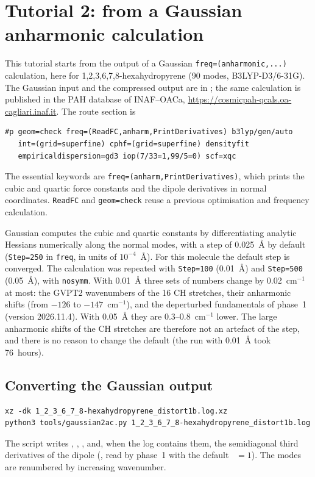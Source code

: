 \chapter{Tutorial 2: from a Gaussian anharmonic calculation}\label{ch:tut-gaussian}

This tutorial starts from the output of a Gaussian
\texttt{freq=(anharmonic,...)} calculation, here for
1,2,3,6,7,8-hexahydropyrene (90 modes, B3LYP-D3/6-31G). The Gaussian input
and the compressed output are in ; the
same calculation is published in the PAH database of INAF--OACa,
\url{https://cosmicpah-qcals.oa-cagliari.inaf.it}. The route section is
\begin{lstlisting}
#p geom=check freq=(ReadFC,anharm,PrintDerivatives) b3lyp/gen/auto
   int=(grid=superfine) cphf=(grid=superfine) densityfit
   empiricaldispersion=gd3 iop(7/33=1,99/5=0) scf=xqc
\end{lstlisting}
The essential keywords are \texttt{freq=(anharm,PrintDerivatives)}, which
prints the cubic and quartic force constants and the dipole derivatives
in normal coordinates. \texttt{ReadFC} and \texttt{geom=check} reuse a
previous optimisation and frequency calculation.

Gaussian computes the cubic and quartic constants by differentiating
analytic Hessians numerically along the normal modes, with a step of
0.025~\AA{} by default (\texttt{Step=250} in \texttt{freq}, in units of
$10^{-4}$~\AA). For this molecule the default step is converged. The
calculation was repeated with \texttt{Step=100} (0.01~\AA) and
\texttt{Step=500} (0.05~\AA), with \texttt{nosymm}. With 0.01~\AA{}
three sets of numbers change by 0.02~cm$^{-1}$ at most: the GVPT2
wavenumbers of the 16 CH stretches, their anharmonic shifts (from $-126$
to $-147$~cm$^{-1}$), and the deperturbed fundamentals of phase~1
(version 2026.11.4). With 0.05~\AA{} they are 0.3--0.8~cm$^{-1}$ lower.
The large anharmonic shifts of the CH stretches are therefore not an
artefact of the step, and there is no reason to change the default
(the run with 0.01~\AA{} took 76~hours).

\section{Converting the Gaussian output}

\begin{lstlisting}
xz -dk 1_2_3_6_7_8-hexahydropyrene_distort1b.log.xz
python3 tools/gaussian2ac.py 1_2_3_6_7_8-hexahydropyrene_distort1b.log
\end{lstlisting}
The script writes , , ,
 and, when the log contains them, the semidiagonal third
derivatives of the dipole (, read by phase~1 with the
default ~$=1$). The
modes are renumbered by increasing wavenumber.

